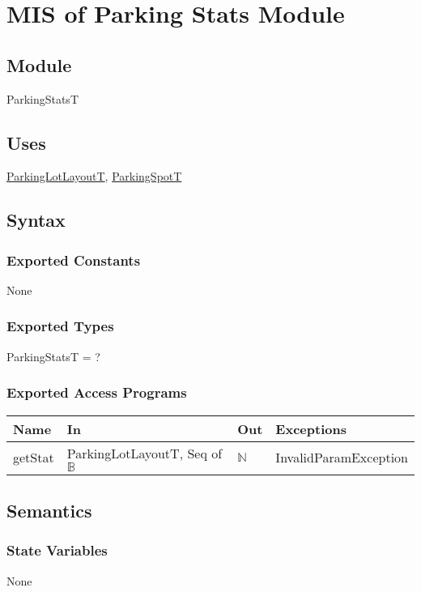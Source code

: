 \documentclass[12pt, titlepage]{article}
\begin{document}
\newpage

\section{MIS of Parking Stats Module} 
\label{parkingStats:Module}

\subsection{Module}
ParkingStatsT

\subsection{Uses}
\hyperref[parkingLotLayout:Module]{ParkingLotLayoutT},
\hyperref[parkingSpot:Module]{ParkingSpotT}

\subsection{Syntax}

\subsubsection{Exported Constants}
None

\subsubsection{Exported Types}
ParkingStatsT = ?

\subsubsection{Exported Access Programs}

\begin{tabular}{l l l l}
\hline
\textbf{Name} & \textbf{In} & \textbf{Out} & \textbf{Exceptions} \\
\hline
getStat & ParkingLotLayoutT, Seq of $\mathbb{B}$ & $\mathbb{N}$ &
InvalidParamException\\
\hline
\end{tabular}

\subsection{Semantics}

\subsubsection{State Variables}
None
\end{document}
